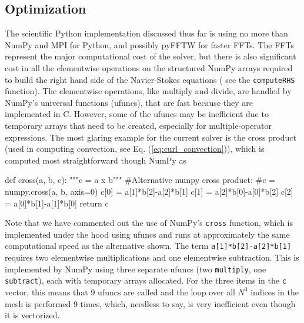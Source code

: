 \documentclass[final,3p,times,twocolumn]{elsarticle}
\newcommand{\inpyth}{\lstinline[style=inlinestyle]}
\begin{document}
\subsection{Optimization}
\label{sec:optimization}
The scientific Python implementation discussed thus far is using no more than 
NumPy and MPI for Python, and possibly pyFFTW for faster FFTs. The FFTs 
represent the major computational cost of the solver, but there is also 
significant cost in all the elementwise operations on the structured NumPy 
arrays required to build the right hand side of the Navier-Stokes equations (
see the \inpyth{computeRHS} function). The elementwise operations, like 
multiply 
and divide, are handled by NumPy's universal functions (ufuncs), that are fast 
because they are implemented in C. However, some of the ufuncs may be 
inefficient due to temporary arrays that need to be created, especially for 
multiple-operator expressions. The most glaring example for the current solver 
is the cross product (used in computing convection, see Eq. 
(\ref{eq:curl_convection})), which is computed most straightforward though 
NumPy as
\begin{python}
def cross(a, b, c):
    """c = a x b"""
    #Alternative numpy cross product:
    #c = numpy.cross(a, b, axis=0)
    c[0] = a[1]*b[2]-a[2]*b[1]
    c[1] = a[2]*b[0]-a[0]*b[2]
    c[2] = a[0]*b[1]-a[1]*b[0]
    return c
\end{python}
Note that we have commented out the use of NumPy's \inpyth{cross} function, 
which is implemented under the hood using ufuncs and runs at approximately the 
same computational speed as the alternative shown. The term 
\inpyth{a[1]*b[2]-a[2]*b[1]} requires two elementwise multiplications and one 
elementwise subtraction. This is implemented by NumPy using three separate 
ufuncs (two \inpyth{multiply}, one \inpyth{subtract}), each with temporary 
arrays allocated. For the three items in the \inpyth{c} vector, this means that 
9 ufuncs are called and the loop over all $N^3$ indices in the mesh is 
performed 9 times, which, needless to say, is very inefficient even though it 
is vectorized.
\end{document}
